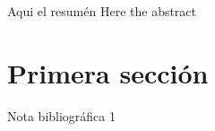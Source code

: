 \documentclass[twocolumn]{articleUdeA}
\begin{document}

\author{Autor1}          %

\begin{resumen}
{%
  Aqui el resumén
}%
{%
  Here the abstract     %
}%
\end{resumen}

\mtitle

\section{Primera sección}
\label{sec:primera-seccion}

\begin{thebibliography}{00}
 Nota bibliográfica 1
\end{thebibliography}
\end{document}
